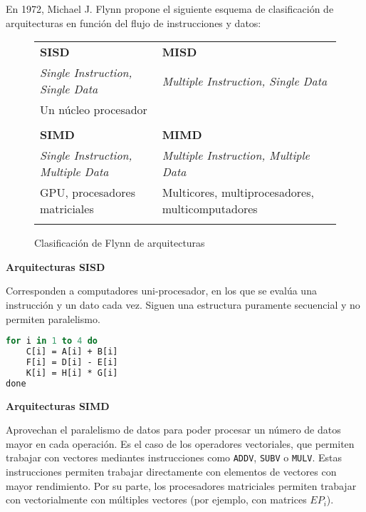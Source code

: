 En 1972, Michael J. Flynn propone el siguiente esquema de clasificación de arquitecturas en función del flujo de instrucciones y datos:

\begin{figure}
\begin{center}
\begin{tabular}{C{6.5cm} | C{6.5cm}}
\textbf{SISD}                              & \textbf{MISD}                                    \\
\textit{Single Instruction, Single Data}   & \textit{Multiple Instruction, Single Data}       \\
Un núcleo procesador                       &                                                  \\
                     &                            \\
\hline
\textbf{SIMD}                              & \textbf{MIMD}                                    \\
\textit{Single Instruction, Multiple Data} & \textit{Multiple Instruction, Multiple Data}     \\
GPU, procesadores matriciales              & Multicores, multiprocesadores, multicomputadores \\
                     &                            \\
\end{tabular}
\end{center}
\caption{Clasificación de Flynn de arquitecturas}
\end{figure}

\pagebreak

\textbf{Arquitecturas SISD}

Corresponden a computadores uni-procesador, en los que se evalúa una instrucción y un dato cada vez.
Siguen una estructura puramente secuencial y no permiten paralelismo.

\begin{lstlisting}[language=Pascal]
for i in 1 to 4 do
	C[i] = A[i] + B[i]
	F[i] = D[i] - E[i]
	K[i] = H[i] * G[i]
done
\end{lstlisting}

\textbf{Arquitecturas SIMD}

Aprovechan el paralelismo de datos para poder procesar un número de datos mayor en cada operación.
Es el caso de los operadores vectoriales, que permiten trabajar con vectores mediantes instrucciones como \texttt{ADDV}, \texttt{SUBV} o \texttt{MULV}.
Estas instrucciones permiten trabajar directamente con elementos de vectores con mayor rendimiento.
Por su parte, los procesadores matriciales permiten trabajar con vectorialmente con múltiples vectores (por ejemplo, con matrices $EP_i$).

